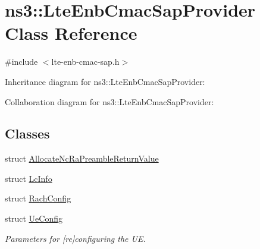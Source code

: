 \hypertarget{classns3_1_1LteEnbCmacSapProvider}{}\section{ns3\+:\+:Lte\+Enb\+Cmac\+Sap\+Provider Class Reference}
\label{classns3_1_1LteEnbCmacSapProvider}


{\ttfamily \#include $<$lte-\/enb-\/cmac-\/sap.\+h$>$}



Inheritance diagram for ns3\+:\+:Lte\+Enb\+Cmac\+Sap\+Provider\+:


Collaboration diagram for ns3\+:\+:Lte\+Enb\+Cmac\+Sap\+Provider\+:
\subsection*{Classes}
\begin{DoxyCompactItemize}
\item 
struct \hyperlink{structns3_1_1LteEnbCmacSapProvider_1_1AllocateNcRaPreambleReturnValue}{Allocate\+Nc\+Ra\+Preamble\+Return\+Value}
\item 
struct \hyperlink{structns3_1_1LteEnbCmacSapProvider_1_1LcInfo}{Lc\+Info}
\item 
struct \hyperlink{structns3_1_1LteEnbCmacSapProvider_1_1RachConfig}{Rach\+Config}
\item 
struct \hyperlink{structns3_1_1LteEnbCmacSapProvider_1_1UeConfig}{Ue\+Config}
\begin{DoxyCompactList}\small\item\em Parameters for \mbox{[}re\mbox{]}configuring the UE. \end{DoxyCompactList}\end{DoxyCompactItemize}
